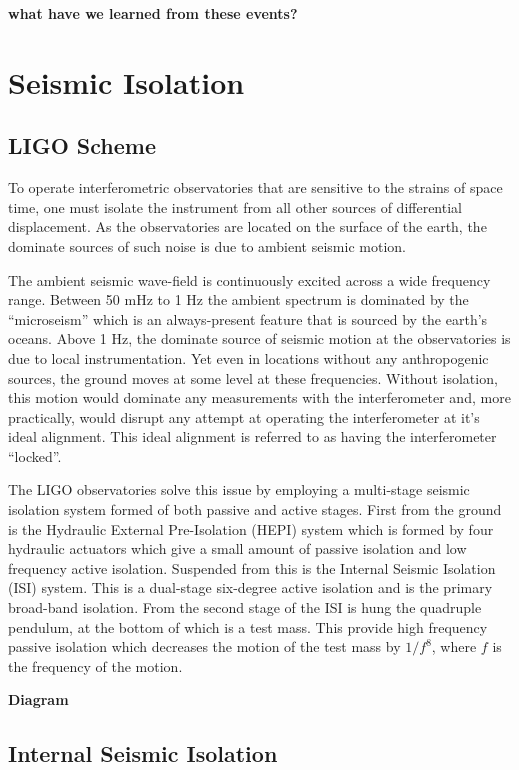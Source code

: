 \documentclass [12pt, proquest]{uwthesis}[2019]
\begin{document}
\textbf{what have we learned from these events?}

\section{Seismic Isolation}

\subsection{LIGO Scheme}

To operate interferometric observatories that are sensitive to the strains of space time, one must isolate the instrument from all other sources of differential displacement. As the observatories are located on the surface of the earth, the dominate sources of such noise is due to ambient seismic motion. 

The ambient seismic wave-field is continuously excited across a wide frequency range. Between 50 mHz to 1 Hz the ambient spectrum is dominated by the ``microseism'' which is an always-present feature that is sourced by the earth's oceans. Above 1 Hz, the dominate source of seismic motion at the observatories is due to local instrumentation. Yet even in locations without any anthropogenic sources, the ground moves at some level at these frequencies. Without isolation, this motion would dominate any measurements with the interferometer and, more practically, would disrupt any attempt at operating the interferometer at it's ideal alignment. This ideal alignment is referred to as having the interferometer ``locked''.

The LIGO observatories solve this issue by employing a multi-stage seismic isolation system formed of both passive and active stages. First from the ground is the Hydraulic External Pre-Isolation (HEPI) system which is formed by four hydraulic actuators which give a small amount of passive isolation and low frequency active isolation. Suspended from this is the Internal Seismic Isolation (ISI) system. This is a dual-stage six-degree active isolation and is the primary broad-band isolation. From the second stage of the ISI is hung the quadruple pendulum, at the bottom of which is a test mass. This provide high frequency passive isolation which decreases the motion of the test mass by $1/f^8$, where $f$ is the frequency of the motion.

\textbf{Diagram}

\subsection{Internal Seismic Isolation}
\end{document}
